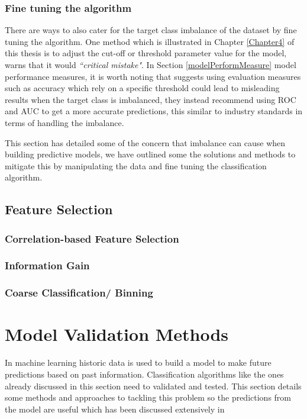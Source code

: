 \subsubsection{Fine tuning the algorithm}
There are ways to also cater for the target class imbalance of the dataset by fine tuning the algorithm. One method which is illustrated in Chapter \ref{Chapter4} of this thesis is to adjust the cut-off or threshold parameter value for the model, \cite{provost_machine_2000} warns that it would \textit{``critical mistake"}. In Section \ref{modelPerformMeasure} model performance measures, it is  worth noting that \cite{chawla_editorial:_2004} suggests using evaluation measures such as accuracy which rely on a specific threshold could lead to misleading results when the target class is imbalanced, they instead recommend using ROC and AUC to get a more accurate predictions, this similar to industry standards in terms of handling the imbalance.

This section has detailed some of the concern that imbalance can cause when building predictive models, we have outlined some the solutions and methods to mitigate this by manipulating the data and fine tuning the classification algorithm.


\subsection{Feature Selection}
\subsubsection{Correlation-based Feature Selection}
\subsubsection{Information Gain}
\subsubsection{Coarse Classification/ Binning}



\section{Model Validation Methods}
In machine learning historic data is used to build a model to make future predictions based on past information. Classification algorithms like the ones already discussed in this section need to validated and tested. This section details some methods and approaches to tackling this problem so the predictions from the model are useful which has been discussed extensively in \citep{refaeilzadeh_cross-validation_2009}

